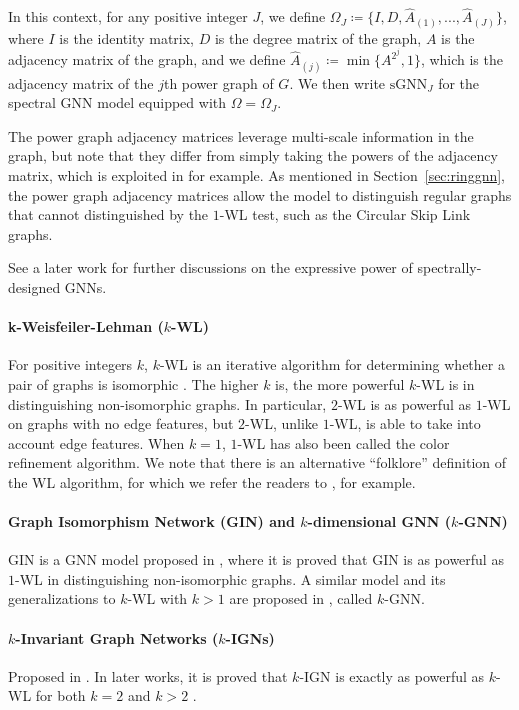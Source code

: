 \documentclass{article}
\begin{document}
In this context, for any positive integer $J$, we define $\Omega_J \coloneqq \{ I, D, \hat{A}_{(1)}, ..., \hat{A}_{(J)} \}$, where $I$ is the identity matrix, $D$ is the degree matrix of the graph, $A$ is the adjacency matrix of the graph, and we define $\hat{A}_{(j)} \coloneqq \min\{A^{2^j},1\}$, which is the adjacency matrix of the $j$th power graph of $G$.
We then write $\text{sGNN}_J$ for the spectral GNN model equipped with $\Omega = \Omega_J$.

The power graph adjacency matrices leverage multi-scale information in the graph, but note that they differ from simply taking the powers of the adjacency matrix, which is exploited in \cite{liao2018lanczosnet} for example. As mentioned in Section~\ref{sec:ringgnn}, the power graph adjacency matrices allow the model to distinguish regular graphs that cannot distinguished by the $1$-WL test, such as the Circular Skip Link graphs. 

See a later work \cite{wang2022powerful} for further discussions on the expressive power of spectrally-designed GNNs.

\paragraph{k-Weisfeiler-Lehman ($k$-WL)} For positive integers $k$, $k$-WL is an iterative algorithm for determining whether a pair of graphs is isomorphic \cite{weisfeiler1968reduction}. The higher $k$ is, the more powerful $k$-WL is in distinguishing non-isomorphic graphs. In particular, $2$-WL is as powerful as $1$-WL on graphs with no edge features, but $2$-WL, unlike $1$-WL, is able to take into account edge features. When $k=1$, $1$-WL has also been called the color refinement algorithm. We note that there is an alternative ``folklore'' definition of the WL algorithm, for which we refer the readers to \cite{cai1992optimal, maron2019provably}, for example.

\paragraph{Graph Isomorphism Network (GIN) and $k$-dimensional GNN ($k$-GNN)} GIN is a GNN model proposed in \cite{xu2018powerful}, where it is proved that GIN is as powerful as $1$-WL in distinguishing non-isomorphic graphs. A similar model and its generalizations to $k$-WL with $k > 1$ are proposed in \cite{morris2019higher}, called $k$-GNN.

\paragraph{$k$-Invariant Graph Networks ($k$-IGNs)} Proposed in \cite{maron2018invariant, maron2019universality}. In later works, it is proved that $k$-IGN is exactly as powerful as $k$-WL for both $k=2$ \cite{chen2020can} and $k > 2$ \cite{geerts2020expressive, geerts2022expressiveness}.
\end{document}
